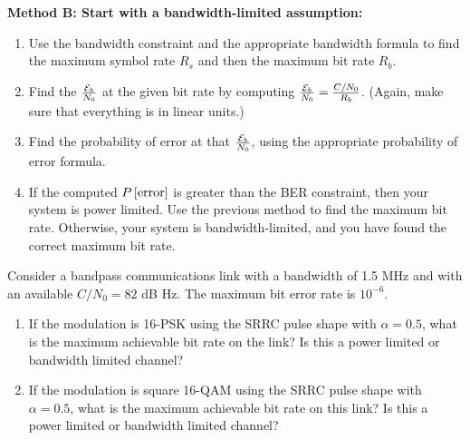 \textbf{Method B: Start with a bandwidth-limited assumption:
}\begin{enumerate}
  \item Use the bandwidth constraint and the appropriate bandwidth formula to find the maximum symbol
    rate $R_s$ and then the maximum bit rate $R_b$.
  \item Find the $\frac{\mathcal{E}_b}{N_0}$ at the given bit rate by computing $\frac{\mathcal{E}_b}{N_0} = \frac{C/N_0}{R_b}$.
    (Again, make sure that everything is in linear units.)
  \item Find the probability of error at that $\frac{\mathcal{E}_b}{N_0}$, using  the appropriate probability of error
    formula.
  \item If the computed $P\left[{\mbox{error}}\right]$ is greater than the BER
    constraint, then your system is power limited.  Use the previous
    method to find the maximum bit rate.  Otherwise, your system is
    bandwidth-limited, and you have found the correct maximum bit rate.
\end{enumerate}



Consider a bandpass communications link with a bandwidth of 1.5 MHz and with an available $C/N_0 = 82$ dB Hz. The maximum bit error rate is $10^{-6}$.
\begin{enumerate}
  \item If the modulation is 16-PSK using the SRRC pulse shape with $\alpha = 0.5$, what is the maximum achievable bit rate on the link? Is this a power limited or bandwidth limited channel?
  \item If the modulation is square 16-QAM using the SRRC pulse shape with $\alpha = 0.5$, what is the maximum achievable bit rate on this link? Is this a power limited or bandwidth limited channel?
\end{enumerate}

